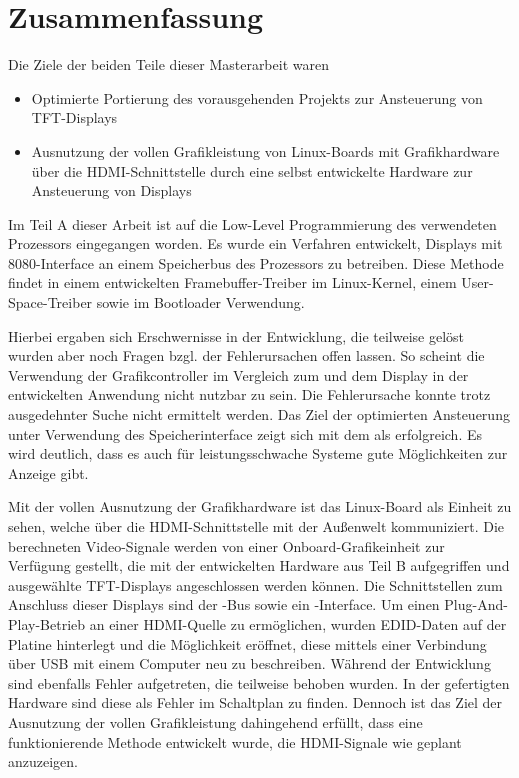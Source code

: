 \chapter{Zusammenfassung}
\label{cha:Zusammenfassung}
Die Ziele der beiden Teile dieser Masterarbeit waren
\begin{itemize}
\item Optimierte Portierung des vorausgehenden Projekts zur Ansteuerung von TFT-Displays
\item Ausnutzung der vollen Grafikleistung von Linux-Boards mit Grafikhardware über die HDMI-Schnittstelle durch eine selbst entwickelte Hardware zur Ansteuerung von Displays
\end{itemize}
Im Teil A dieser Arbeit ist auf die Low-Level Programmierung des verwendeten Prozessors  eingegangen worden. Es wurde ein Verfahren entwickelt, Displays mit 8080-Interface an einem Speicherbus des Prozessors zu betreiben. Diese Methode findet in einem entwickelten Framebuffer-Treiber im Linux-Kernel, einem User-Space-Treiber sowie im Bootloader Verwendung.\newline

Hierbei ergaben sich Erschwernisse in der Entwicklung, die teilweise gelöst wurden aber noch Fragen bzgl. der Fehlerursachen offen lassen. 
So scheint die Verwendung der Grafikcontroller  im Vergleich zum  und dem Display  in der entwickelten Anwendung nicht nutzbar zu sein. Die Fehlerursache konnte trotz ausgedehnter Suche nicht ermittelt werden.\newline
Das Ziel der optimierten Ansteuerung unter Verwendung des Speicherinterface zeigt sich mit dem  als erfolgreich. Es wird deutlich, dass es auch für leistungsschwache Systeme gute Möglichkeiten zur Anzeige gibt.\newline

Mit der vollen Ausnutzung der Grafikhardware ist das Linux-Board als Einheit zu sehen, welche über die HDMI-Schnittstelle mit der Außenwelt kommuniziert. Die berechneten Video-Signale werden von einer Onboard-Grafikeinheit zur Verfügung gestellt, die mit der entwickelten Hardware aus Teil B aufgegriffen und ausgewählte TFT-Displays angeschlossen werden können. Die Schnittstellen zum Anschluss dieser Displays sind der -Bus sowie ein -Interface.\newline
Um einen Plug-And-Play-Betrieb an einer HDMI-Quelle zu ermöglichen, wurden EDID-Daten auf der Platine hinterlegt und die Möglichkeit eröffnet, diese mittels einer Verbindung über USB mit einem Computer neu zu beschreiben.\newline
Während der Entwicklung sind ebenfalls Fehler aufgetreten, die teilweise behoben wurden. In der gefertigten Hardware sind diese als Fehler im Schaltplan zu finden.\newline
Dennoch ist das Ziel der Ausnutzung der vollen Grafikleistung dahingehend erfüllt, dass eine funktionierende Methode entwickelt wurde, die HDMI-Signale wie geplant anzuzeigen.
